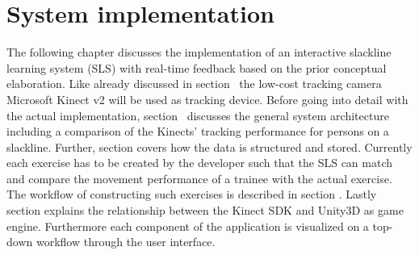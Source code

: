 \chapter{System implementation}\label{5_systemIntegration}
The following chapter discusses the implementation of an interactive slackline learning system (SLS) with real-time feedback based on the prior conceptual elaboration.
Like already discussed in section~\textit{} the low-cost tracking camera Microsoft Kinect v2 will be used as tracking device.
Before going into detail with the actual implementation, section~\textit{} discusses the general system architecture including a comparison of the Kinects' tracking performance for persons on a slackline.
Further, section \textit{} covers how the data is structured and stored.
Currently each exercise has to be created by the developer such that the SLS can match and compare the movement performance of a trainee with the actual exercise. 
The workflow of constructing such exercises is described in section \textit{}.
Lastly section \textit{} explains the relationship between the Kinect SDK and Unity3D as game engine. Furthermore each component of the application is visualized on a top-down workflow through the user interface.








